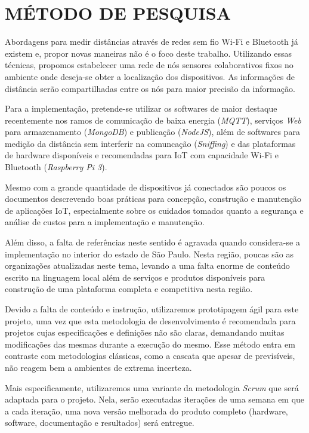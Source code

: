 
\chapter{MÉTODO DE PESQUISA}
\label{chap:MÉTODO DE PESQUISA}

Abordagens para medir distâncias através de redes sem fio Wi-Fi
\cite{bahillo2009ieee} e Bluetooth já existem e, propor novas maneiras não é o
foco deste trabalho. Utilizando essas técnicas, propomos estabelecer uma rede de
nós sensores colaborativos fixos no ambiente onde deseja-se obter a localização
dos dispositivos. As informações de distância serão compartilhadas entre os nós
para maior precisão da informação.

Para a implementação, pretende-se utilizar os softwares de maior destaque
recentemente nos ramos de comunicação de baixa energia (\textit{MQTT}), serviços
\textit{Web} para armazenamento (\textit{MongoDB}) e publicação
(\textit{NodeJS}), além de softwares para medição da distância sem interferir na
comuncação (\textit{Sniffing}) e das plataformas de hardware disponíveis e
recomendadas para IoT com capacidade Wi-Fi e Bluetooth (\textit{Raspberry Pi
3}).

Mesmo com a grande quantidade de dispositivos já conectados são poucos os
documentos descrevendo boas práticas para concepção, construção e manutenção de
aplicações IoT, especialmente sobre os cuidados tomados quanto a segurança e
análise de custos para a implementação e manutenção.

Além disso, a falta de referências neste sentido é agravada quando considera-se
a implementação no interior do estado de São Paulo. Nesta região, poucas são as
organizações atualizadas neste tema, levando a uma falta enorme de conteúdo
escrito na linguagem local além de serviços e produtos disponíveis para
construção de uma plataforma completa e competitiva nesta região.

Devido a falta de conteúdo e instrução, utilizaremos prototipagem ágil para este
projeto, uma vez que esta metodologia de desenvolvimento é recomendada para
projetos cujas especificações e definições não são claras, demandando muitas
modificações das mesmas durante a execução do mesmo. Esse método entra em
contraste com metodologias clássicas, como a cascata que apesar de previsíveis,
não reagem bem a ambientes de extrema incerteza.

Mais especificamente, utilizaremos uma variante da metodologia \textit{Scrum}
\cite{James2016} que será adaptada para o projeto. Nela, serão executadas
iterações de uma semana em que a cada iteração, uma nova versão melhorada do
produto completo (hardware, software, documentação e resultados) será entregue.


